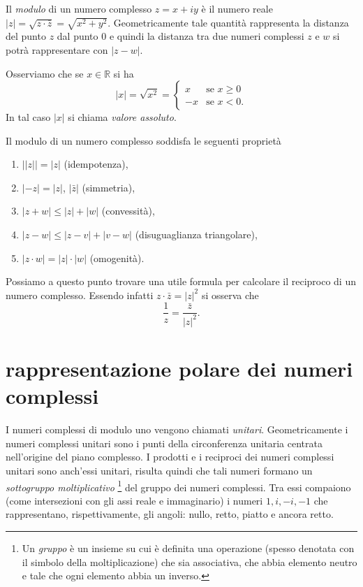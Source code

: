 \documentclass[italian,a4paper,oneside,headinclude]{scrbook}
\newcommand{\myemph}[1]{\emph{#1}\marginpar{#1}}
\newcommand{\RR}{\mathbb R}
\newcommand{\abs}[1]{{\left|#1\right|}}
\begin{document}
Il \myemph{modulo} di un numero complesso $z=x+iy$
è il numero reale $ \abs{z} = \sqrt{z\cdot\bar z} = \sqrt{x^2+y^2}$.
Geometricamente tale quantità rappresenta la distanza del punto $z$
dal punto $0$ e quindi la distanza tra due numeri complessi $z$ e
$w$ si potrà rappresentare con $\abs{z-w}$.

Osserviamo che se $x\in \RR$ si ha
\[
\abs{x}
= \sqrt{x^2}
=
\begin{cases}
  x &\text{se $x\ge 0$}\\
  -x &\text{se $x<0$}.
\end{cases}
\]
In tal caso $\abs{x}$ si chiama \myemph{valore assoluto}.

Il modulo di un numero complesso soddisfa le seguenti proprietà
\begin{enumerate}
\item $\abs{\abs{z}} = \abs{z}$ (idempotenza),
\item $\abs{-z} = \abs{z}$, $\abs{\bar z}$ (simmetria),
\item $\abs{z+w} \le \abs{z}+\abs{w}$ (convessità),
\item $\abs{z-w} \le \abs{z-v} + \abs{v-w}$ (disuguaglianza triangolare),
\item $\abs{z\cdot w} = \abs{z}\cdot\abs{w}$ (omogenità).
\end{enumerate}

Possiamo a questo punto trovare una utile formula per calcolare
il reciproco di un numero complesso. Essendo infatti
$z\cdot \bar z = \abs{z}^2$ si osserva che
\[
  \frac{1}{z} = \frac{\bar z}{\abs{z}^2}.
\]

\section{rappresentazione polare dei numeri complessi}

I numeri complessi di modulo uno vengono chiamati \myemph{unitari}.
Geometricamente i numeri complessi unitari sono i punti della circonferenza
unitaria centrata nell'origine del piano complesso.
I prodotti e i
reciproci dei numeri complessi unitari sono anch'essi unitari,
risulta quindi che tali numeri formano un \emph{sottogruppo moltiplicativo}%
\footnote{
Un \emph{gruppo} è un insieme su cui è definita una operazione
(spesso denotata con il simbolo della moltiplicazione) che sia associativa,
che abbia elemento neutro e tale che ogni elemento abbia un inverso.
}
del gruppo dei numeri complessi.
Tra essi compaiono (come intersezioni con gli assi reale e immaginario)
i numeri $1, i, -i, -1$ che rappresentano, rispettivamente, gli angoli:
nullo, retto, piatto e ancora retto.
\end{document}
